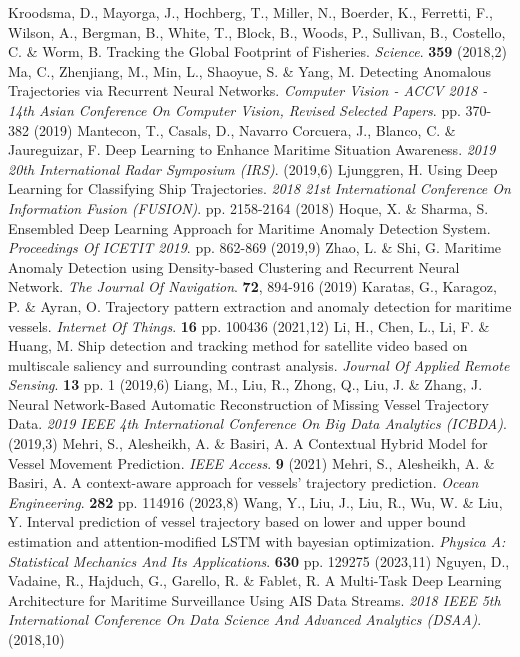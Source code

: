 Kroodsma, D., Mayorga, J., Hochberg, T., Miller, N., Boerder, K., Ferretti, F., Wilson, A., Bergman, B., White, T., Block, B., Woods, P., Sullivan, B., Costello, C. \& Worm, B. Tracking the Global Footprint of Fisheries. {\em Science}. \textbf{359} (2018,2)
Ma, C., Zhenjiang, M., Min, L., Shaoyue, S. \& Yang, M. Detecting Anomalous Trajectories via Recurrent Neural Networks. {\em Computer Vision - ACCV 2018 - 14th Asian Conference On Computer Vision, Revised Selected Papers}. pp. 370-382 (2019)
Mantecon, T., Casals, D., Navarro Corcuera, J., Blanco, C. \& Jaureguizar, F. Deep Learning to Enhance Maritime Situation Awareness. {\em 2019 20th International Radar Symposium (IRS)}. (2019,6)
Ljunggren, H. Using Deep Learning for Classifying Ship Trajectories. {\em 2018 21st International Conference On Information Fusion (FUSION)}. pp. 2158-2164 (2018)
Hoque, X. \& Sharma, S. Ensembled Deep Learning Approach for Maritime Anomaly Detection System. {\em Proceedings Of ICETIT 2019}. pp. 862-869 (2019,9)
Zhao, L. \& Shi, G. Maritime Anomaly Detection using Density-based Clustering and Recurrent Neural Network. {\em The Journal Of Navigation}. \textbf{72}, 894-916 (2019)
Karatas, G., Karagoz, P. \& Ayran, O. Trajectory pattern extraction and anomaly detection for maritime vessels. {\em Internet Of Things}. \textbf{16} pp. 100436 (2021,12)
Li, H., Chen, L., Li, F. \& Huang, M. Ship detection and tracking method for satellite video based on multiscale saliency and surrounding contrast analysis. {\em Journal Of Applied Remote Sensing}. \textbf{13} pp. 1 (2019,6)
Liang, M., Liu, R., Zhong, Q., Liu, J. \& Zhang, J. Neural Network-Based Automatic Reconstruction of Missing Vessel Trajectory Data. {\em 2019 IEEE 4th International Conference On Big Data Analytics (ICBDA)}. (2019,3)
Mehri, S., Alesheikh, A. \& Basiri, A. A Contextual Hybrid Model for Vessel Movement Prediction. {\em IEEE Access}. \textbf{9} (2021)
Mehri, S., Alesheikh, A. \& Basiri, A. A context-aware approach for vessels' trajectory prediction. {\em Ocean Engineering}. \textbf{282} pp. 114916 (2023,8)
Wang, Y., Liu, J., Liu, R., Wu, W. \& Liu, Y. Interval prediction of vessel trajectory based on lower and upper bound estimation and attention-modified LSTM with bayesian optimization. {\em Physica A: Statistical Mechanics And Its Applications}. \textbf{630} pp. 129275 (2023,11)
Nguyen, D., Vadaine, R., Hajduch, G., Garello, R. \& Fablet, R. A Multi-Task Deep Learning Architecture for Maritime Surveillance Using AIS Data Streams. {\em 2018 IEEE 5th International Conference On Data Science And Advanced Analytics (DSAA)}. (2018,10)
